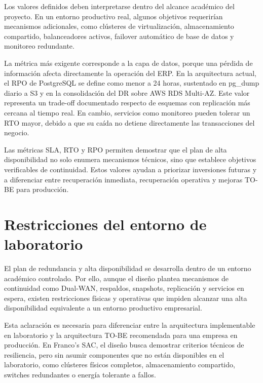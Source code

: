 \documentclass[11pt, a4paper, oneside]{report}
\begin{document}
Los valores definidos deben interpretarse dentro del alcance académico del proyecto. En un entorno productivo real, algunos objetivos requerirían mecanismos adicionales, como clústeres de virtualización, almacenamiento compartido, balanceadores activos, failover automático de base de datos y monitoreo redundante.

La métrica más exigente corresponde a la capa de datos, porque una pérdida de información afecta directamente la operación del ERP. En la arquitectura actual, el RPO de PostgreSQL se define como menor a 24 horas, sustentado en pg\_dump diario a S3 y en la consolidación del DR sobre AWS RDS Multi-AZ. Este valor representa un trade-off documentado respecto de esquemas con replicación más cercana al tiempo real. En cambio, servicios como monitoreo pueden tolerar un RTO mayor, debido a que su caída no detiene directamente las transacciones del negocio.

Las métricas SLA, RTO y RPO permiten demostrar que el plan de alta disponibilidad no solo enumera mecanismos técnicos, sino que establece objetivos verificables de continuidad. Estos valores ayudan a priorizar inversiones futuras y a diferenciar entre recuperación inmediata, recuperación operativa y mejoras TO-BE para producción.

\section{Restricciones del entorno de laboratorio}

El plan de redundancia y alta disponibilidad se desarrolla dentro de un entorno académico controlado. Por ello, aunque el diseño plantea mecanismos de continuidad como Dual-WAN, respaldos, snapshots, replicación y servicios en espera, existen restricciones físicas y operativas que impiden alcanzar una alta disponibilidad equivalente a un entorno productivo empresarial.

Esta aclaración es necesaria para diferenciar entre la arquitectura implementable en laboratorio y la arquitectura TO-BE recomendada para una empresa en producción. En Franco's SAC, el diseño busca demostrar criterios técnicos de resiliencia, pero sin asumir componentes que no están disponibles en el laboratorio, como clústeres físicos completos, almacenamiento compartido, switches redundantes o energía tolerante a fallos.
\end{document}
